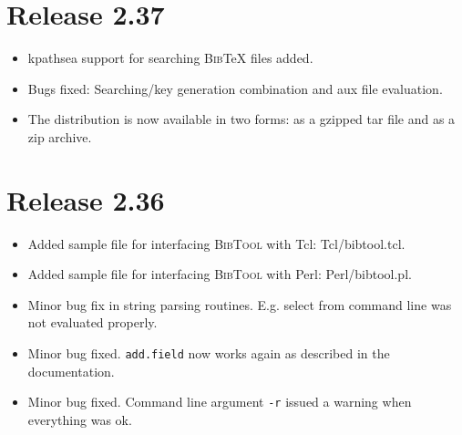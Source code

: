 \documentclass[11pt,a4paper]{scrartcl}
\newcommand\Arg[1]{\texttt{#1}}
\newcommand\rsc[1]{\texttt{#1}}
\newcommand\File[1]{\textsf{#1}}
\newcommand\BibTool{\textsc{BibTool}}
\newcommand\BibTeX{\textsc{Bib}\TeX}
\newenvironment{Release}[2]{%
  \def\tmp{#2}%
  \section*{Release #1 \ifx\tmp\empty\else{\normalsize[#2]}\fi}
  \begin{itemize}
}{\end{itemize}}
\newenvironment{Fix}[1]{\item }{}
\newenvironment{New}[1]{\item }{}
\begin{document}
\begin{multicols}
 \begin{Release}{2.37}{}
  \begin{New}{gene}
    kpathsea support for searching \BibTeX{} files added.
  \end{New}
  \begin{Fix}{gene}
    Bugs fixed: Searching/key generation combination and aux file evaluation.
  \end{Fix}
  \begin{New}{gene}
    The distribution is now available in two forms: as a gzipped tar file and
    as a zip archive.
  \end{New}
 \end{Release}

 \begin{Release}{2.36}{}
  \begin{New}{gene}
    Added sample file for interfacing \BibTool{} with Tcl:
    \File{Tcl/bibtool.tcl}.
  \end{New}
  \begin{New}{gene}
    Added sample file for interfacing \BibTool{} with Perl:
    \File{Perl/bibtool.pl}.
  \end{New}
  \begin{Fix}{gene}
    Minor bug fix in string parsing routines. E.g. select from command line
    was not evaluated properly.
  \end{Fix}
  \begin{Fix}{gene}
    Minor bug fixed. \rsc{add.field} now works again as described in
    the documentation.
  \end{Fix}
  \begin{Fix}{gene}
    Minor bug fixed. Command line argument \Arg{-r} issued a warning
    when everything was ok.
  \end{Fix}
 \end{Release}


\end{multicols}
\end{document}
